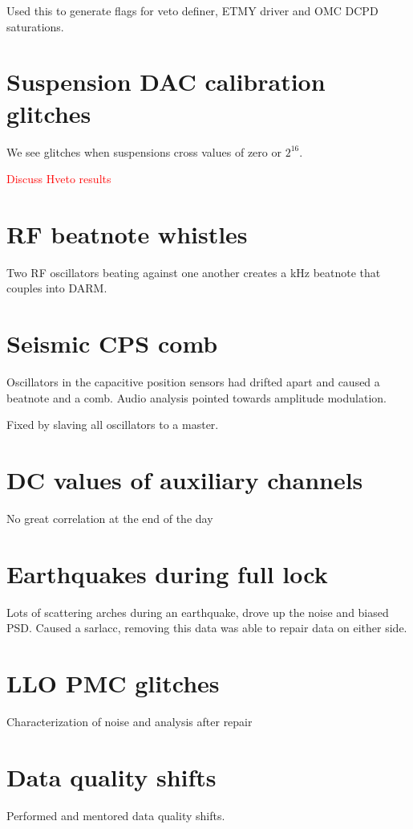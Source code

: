 Used this to generate flags for veto definer, ETMY driver and OMC DCPD saturations.

\section{Suspension DAC calibration glitches}

We see glitches when suspensions cross values of zero or $2^{16}$.

\textcolor{red}{Discuss Hveto results}

\section{RF beatnote whistles}

Two RF oscillators beating against one another creates a kHz beatnote that couples 
into DARM.

\section{Seismic CPS comb}

Oscillators in the capacitive position sensors had drifted apart and caused a 
beatnote and a comb. Audio analysis pointed towards amplitude modulation. 

Fixed by slaving all oscillators to a master.

\section{DC values of auxiliary channels}

No great correlation at the end of the day 

\section{Earthquakes during full lock}

Lots of scattering arches during an earthquake, drove up the noise and biased PSD.
Caused a sarlacc, removing this data was able to repair data on either side.

\section{LLO PMC glitches}

Characterization of noise and analysis after repair

\section{Data quality shifts}
Performed and mentored data quality shifts.



